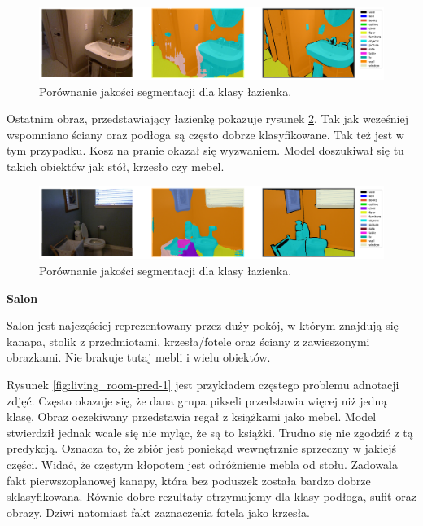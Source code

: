 \begin{figure}[ht!]
    \centering
    \includegraphics[width=\textwidth]{img/preds_analysis/gt_vs_pred/bathroom-2.png}
    \caption{Porównanie jakości segmentacji dla klasy łazienka.}
    \label{fig:bathroom-pred-2}
\end{figure}

Ostatnim obraz, przedstawiający łazienkę pokazuje rysunek \ref{fig:bathroom-pred-3}. Tak jak wcześniej wspomniano ściany oraz podłoga są często dobrze klasyfikowane. Tak też jest w tym przypadku. Kosz na pranie okazał się wyzwaniem. Model doszukiwał się tu takich obiektów jak stół, krzesło czy mebel.

\begin{figure}[ht!]
    \centering
    \includegraphics[width=\textwidth]{img/preds_analysis/gt_vs_pred/bathroom-3.png}
    \caption{Porównanie jakości segmentacji dla klasy łazienka.}
    \label{fig:bathroom-pred-3}
\end{figure}

\noindent
\textbf{Salon}

Salon jest najczęściej reprezentowany przez duży pokój, w którym znajdują się kanapa, stolik z przedmiotami, krzesła/fotele oraz ściany z zawieszonymi obrazkami. Nie brakuje tutaj mebli i wielu obiektów.

Rysunek \ref{fig:living_room-pred-1} jest przykładem częstego problemu adnotacji zdjęć. Często okazuje się, że dana grupa pikseli przedstawia więcej niż jedną klasę. Obraz oczekiwany przedstawia regał z książkami jako mebel. Model stwierdził jednak wcale się nie myląc, że są to książki. Trudno się nie zgodzić z tą predykcją. Oznacza to, że zbiór jest poniekąd wewnętrznie sprzeczny w jakiejś części. Widać, że częstym kłopotem jest odróżnienie mebla od stołu. Zadowala fakt pierwszoplanowej kanapy, która bez poduszek została bardzo dobrze sklasyfikowana. Równie dobre rezultaty otrzymujemy dla klasy podłoga, sufit oraz obrazy. Dziwi natomiast fakt zaznaczenia fotela jako krzesła.

